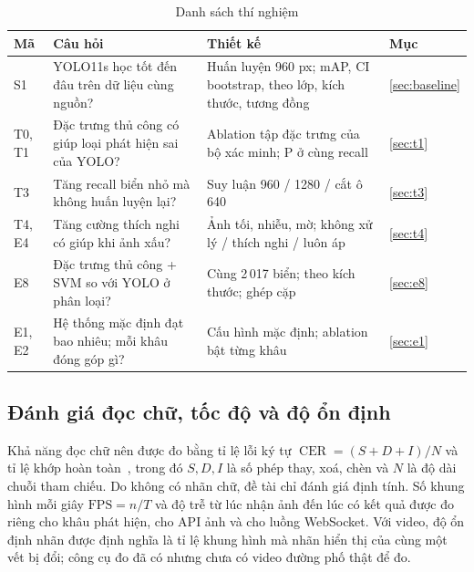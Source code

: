 \begin{table}[H]
\centering
\caption{Danh sách thí nghiệm}
\label{tab:experiments}
\small
\begin{tabularx}{\textwidth}{|>{\centering\arraybackslash}p{1.1cm}|>{\raggedright\arraybackslash}X|>{\raggedright\arraybackslash}p{4.4cm}|>{\centering\arraybackslash}p{1.5cm}|}
\toprule
\textbf{Mã} & \textbf{Câu hỏi} & \textbf{Thiết kế} & \textbf{Mục} \\
\midrule
S1 & YOLO11s học tốt đến đâu trên dữ liệu cùng nguồn? & Huấn luyện 960 px; mAP, CI bootstrap, theo lớp, kích thước, tương đồng & \ref{sec:baseline} \\ \hline
T0, T1 & Đặc trưng thủ công có giúp loại phát hiện sai của YOLO? & Ablation tập đặc trưng của bộ xác minh; P ở cùng recall & \ref{sec:t1} \\ \hline
T3 & Tăng recall biển nhỏ mà không huấn luyện lại? & Suy luận 960 / 1280 / cắt ô 640 & \ref{sec:t3} \\ \hline
T4, E4 & Tăng cường thích nghi có giúp khi ảnh xấu? & Ảnh tối, nhiễu, mờ; không xử lý / thích nghi / luôn áp & \ref{sec:t4} \\ \hline
E8 & Đặc trưng thủ công + SVM so với YOLO ở phân loại? & Cùng 2\,017 biển; theo kích thước; ghép cặp & \ref{sec:e8} \\ \hline
E1, E2 & Hệ thống mặc định đạt bao nhiêu; mỗi khâu đóng góp gì? & Cấu hình mặc định; ablation bật từng khâu & \ref{sec:e1} \\
\bottomrule
\end{tabularx}
\end{table}

\subsection{Đánh giá đọc chữ, tốc độ và độ ổn định}
Khả năng đọc chữ nên được đo bằng tỉ lệ lỗi ký tự $\operatorname{CER}=(S+D+I)/N$ và tỉ lệ khớp hoàn toàn~\cite{torchmetrics_cer}, trong đó $S,D,I$ là số phép thay, xoá, chèn và $N$ là độ dài chuỗi tham chiếu. Do không có nhãn chữ, đề tài chỉ đánh giá định tính. Số khung hình mỗi giây $\mathrm{FPS}=n/T$ và độ trễ từ lúc nhận ảnh đến lúc có kết quả được đo riêng cho khâu phát hiện, cho API ảnh và cho luồng WebSocket. Với video, độ ổn định nhãn được định nghĩa là tỉ lệ khung hình mà nhãn hiển thị của cùng một vết bị đổi; công cụ đo đã có nhưng chưa có video đường phố thật để đo.

